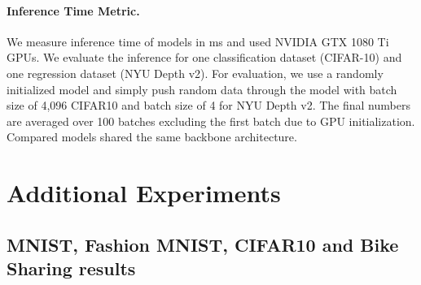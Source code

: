 \paragraph{Inference Time Metric.} We measure inference time of models in ms and used NVIDIA GTX 1080 Ti GPUs. We evaluate the inference for one classification dataset (CIFAR-10) and one regression dataset (NYU Depth v2). For evaluation, we use a randomly initialized model and simply push random data through the model with batch size of 4,096 CIFAR10 and batch size of 4 for NYU Depth v2. The final numbers are averaged over 100 batches excluding the first batch due to GPU initialization. Compared models shared the same backbone architecture.

\section{Additional Experiments}
\label{app:additional_experiments_007}

\subsection{MNIST, Fashion MNIST, CIFAR10 and Bike Sharing results}

